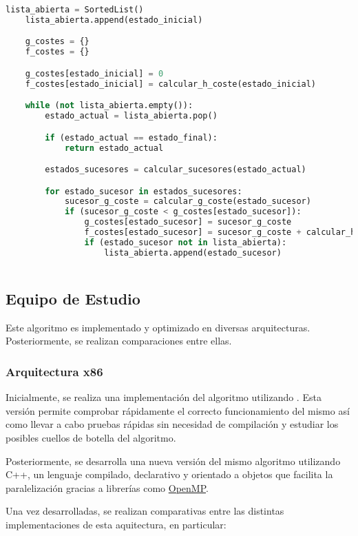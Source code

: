 \begin{lstlisting}[language=Python]
    lista_abierta = SortedList()
    lista_abierta.append(estado_inicial)

    g_costes = {}
    f_costes = {}

    g_costes[estado_inicial] = 0
    f_costes[estado_inicial] = calcular_h_coste(estado_inicial)

    while (not lista_abierta.empty()):
        estado_actual = lista_abierta.pop()

        if (estado_actual == estado_final):
            return estado_actual

        estados_sucesores = calcular_sucesores(estado_actual)

        for estado_sucesor in estados_sucesores:
            sucesor_g_coste = calcular_g_coste(estado_sucesor)
            if (sucesor_g_coste < g_costes[estado_sucesor]):
                g_costes[estado_sucesor] = sucesor_g_coste
                f_costes[estado_sucesor] = sucesor_g_coste + calcular_h_coste(estado_sucesor)
                if (estado_sucesor not in lista_abierta):
                    lista_abierta.append(estado_sucesor)
            
\end{lstlisting}

\subsection{Equipo de Estudio}

Este algoritmo es implementado y optimizado en diversas arquitecturas.
Posteriormente, se realizan comparaciones entre ellas.

\subsubsection{Arquitectura x86}

Inicialmente, se realiza una implementación del algoritmo utilizando \Python.
Esta versión permite comprobar rápidamente el correcto funcionamiento del mismo
así como llevar a cabo pruebas rápidas sin necesidad de compilación y
estudiar los posibles cuellos de botella del algoritmo.

Posteriormente, se desarrolla una nueva versión del mismo algoritmo
utilizando C++, un lenguaje compilado, declarativo y orientado a objetos
que facilita la paralelización gracias a librerías como 
\href{https://www.openmp.org/}{OpenMP}\@.

Una vez desarrolladas,
se realizan comparativas entre las distintas implementaciones
de esta aquitectura, en particular:

